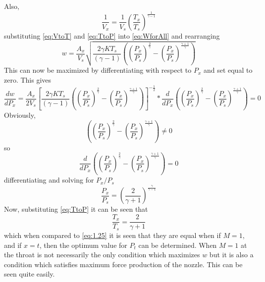 Also,
\begin{equation}\label{eq:VtoT}
\frac{1}{V_x}=\frac{1}{V_s}\left(\frac{T_x}{T_s}\right)^{\frac{1}{\gamma-1}}
\end{equation}
substituting \ref{eq:VtoT} and \ref{eq:TtoP} into \ref{eq:WforAll} and rearranging
\begin{equation}\label{eq:diffW}
w=\frac{A_x}{V_s}\sqrt{\frac{2\gamma KT_s}{(\gamma-1)}\left(\left(\frac{P_x}{P_s}\right)^{\frac{2}{\gamma}}-\left(\frac{P_x}{P_s}\right)^{\frac{\gamma+1}{\gamma}}\right)}
\end{equation}
This can now be maximized by differentiating with respect to $P_x$ and set equal to zero. This gives
\begin{equation}
\frac{dw}{dP_x}=\frac{A_x}{2V_s}\left[\frac{2\gamma KT_s}{(\gamma-1)}\left(\left(\frac{P_x}{P_s}\right)^{\frac{2}{\gamma}}-\left(\frac{P_x}{P_s}\right)^{\frac{\gamma+1}{\gamma}}\right)\right]^{-\frac{1}{2}}*\frac{d}{dP_x}\left(\left(\frac{P_x}{P_s}\right)^{\frac{2}{\gamma}}-\left(\frac{P_x}{P_s}\right)^{\frac{\gamma+1}{\gamma}}\right)=0
\end{equation}
Obviously, 
\begin{equation}
\left(\left(\frac{P_x}{P_s}\right)^{\frac{2}{\gamma}}-\left(\frac{P_x}{P_s}\right)^{\frac{\gamma+1}{\gamma}}\right)\neq0
\end{equation}
so
\begin{equation}
\frac{d}{dP_x}\left(\left(\frac{P_x}{P_s}\right)^{\frac{2}{\gamma}}-\left(\frac{P_x}{P_s}\right)^{\frac{\gamma+1}{\gamma}}\right)=0
\end{equation}
differentiating and solving for $P_x/P_s$
\begin{equation}
\frac{P_x}{P_s}=\left(\frac{2}{\gamma+1}\right)^{\frac{\gamma}{\gamma-1}}
\end{equation}
Now, substituting \ref{eq:TtoP} it can be seen that
\begin{equation}
\frac{T_x}{T_s}=\frac{2}{\gamma+1}
\end{equation}
which when compared to \ref{eq:1.25} it is seen that they are equal when 
if $M=1$, and if $x=t$, then the optimum value for $P_t$ can be determined. When $M=1$ at the throat is not necessarily the only condition which maximizes $w$ but it is also a condition which satisfies maximum force production of the nozzle. This can be seen quite easily. 
